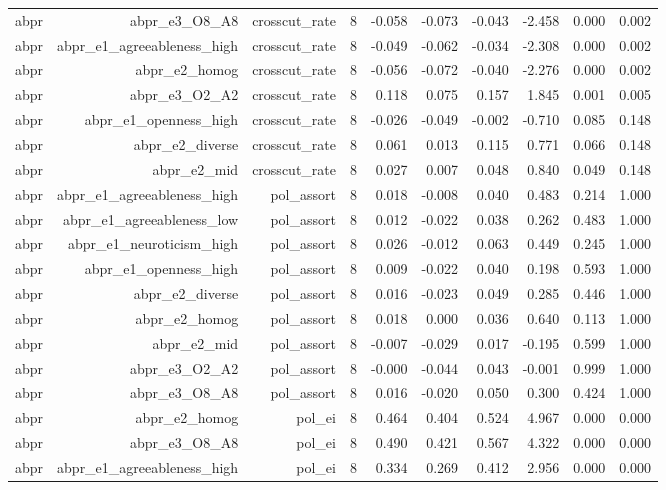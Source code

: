 \documentclass[11pt]{article}
\begin{document}
\begin{landscape}
\begin{longtable}{@{}lrrrrrrrrr@{}}
abpr & abpr\_e3\_O8\_A8 & crosscut\_rate & 8 & -0.058 & -0.073 & -0.043 & -2.458 & 0.000 & 0.002 \\
abpr & abpr\_e1\_agreeableness\_high & crosscut\_rate & 8 & -0.049 & -0.062 & -0.034 & -2.308 & 0.000 & 0.002 \\
abpr & abpr\_e2\_homog & crosscut\_rate & 8 & -0.056 & -0.072 & -0.040 & -2.276 & 0.000 & 0.002 \\
abpr & abpr\_e3\_O2\_A2 & crosscut\_rate & 8 & 0.118 & 0.075 & 0.157 & 1.845 & 0.001 & 0.005 \\
abpr & abpr\_e1\_openness\_high & crosscut\_rate & 8 & -0.026 & -0.049 & -0.002 & -0.710 & 0.085 & 0.148 \\
abpr & abpr\_e2\_diverse & crosscut\_rate & 8 & 0.061 & 0.013 & 0.115 & 0.771 & 0.066 & 0.148 \\
abpr & abpr\_e2\_mid & crosscut\_rate & 8 & 0.027 & 0.007 & 0.048 & 0.840 & 0.049 & 0.148 \\
abpr & abpr\_e1\_agreeableness\_high & pol\_assort & 8 & 0.018 & -0.008 & 0.040 & 0.483 & 0.214 & 1.000 \\
abpr & abpr\_e1\_agreeableness\_low & pol\_assort & 8 & 0.012 & -0.022 & 0.038 & 0.262 & 0.483 & 1.000 \\
abpr & abpr\_e1\_neuroticism\_high & pol\_assort & 8 & 0.026 & -0.012 & 0.063 & 0.449 & 0.245 & 1.000 \\
abpr & abpr\_e1\_openness\_high & pol\_assort & 8 & 0.009 & -0.022 & 0.040 & 0.198 & 0.593 & 1.000 \\
abpr & abpr\_e2\_diverse & pol\_assort & 8 & 0.016 & -0.023 & 0.049 & 0.285 & 0.446 & 1.000 \\
abpr & abpr\_e2\_homog & pol\_assort & 8 & 0.018 & 0.000 & 0.036 & 0.640 & 0.113 & 1.000 \\
abpr & abpr\_e2\_mid & pol\_assort & 8 & -0.007 & -0.029 & 0.017 & -0.195 & 0.599 & 1.000 \\
abpr & abpr\_e3\_O2\_A2 & pol\_assort & 8 & -0.000 & -0.044 & 0.043 & -0.001 & 0.999 & 1.000 \\
abpr & abpr\_e3\_O8\_A8 & pol\_assort & 8 & 0.016 & -0.020 & 0.050 & 0.300 & 0.424 & 1.000 \\
abpr & abpr\_e2\_homog & pol\_ei & 8 & 0.464 & 0.404 & 0.524 & 4.967 & 0.000 & 0.000 \\
abpr & abpr\_e3\_O8\_A8 & pol\_ei & 8 & 0.490 & 0.421 & 0.567 & 4.322 & 0.000 & 0.000 \\
abpr & abpr\_e1\_agreeableness\_high & pol\_ei & 8 & 0.334 & 0.269 & 0.412 & 2.956 & 0.000 & 0.000 \\

\end{longtable}
\end{landscape}
\end{document}
